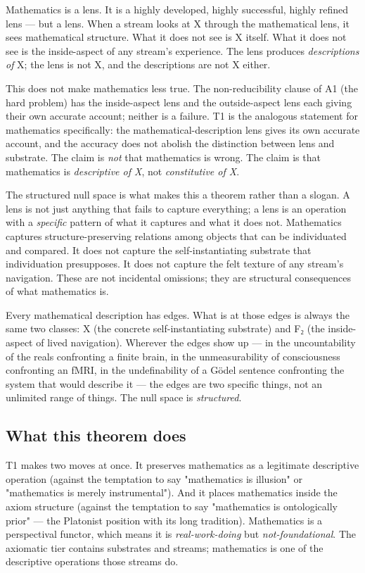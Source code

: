 \documentclass[11pt, openany]{book}
\begin{document}
Mathematics is a lens. It is a highly developed, highly successful, highly refined lens --- but a lens. When a stream looks at X through the mathematical lens, it sees mathematical structure. What it does not see is X itself. What it does not see is the inside-aspect of any stream's experience. The lens produces \textit{descriptions of} X; the lens is not X, and the descriptions are not X either.

This does not make mathematics less true. The non-reducibility clause of A1 (the hard problem) has the inside-aspect lens and the outside-aspect lens each giving their own accurate account; neither is a failure. T1 is the analogous statement for mathematics specifically: the mathematical-description lens gives its own accurate account, and the accuracy does not abolish the distinction between lens and substrate. The claim is \textit{not} that mathematics is wrong. The claim is that mathematics is \textit{descriptive of X}, not \textit{constitutive of X}.

The structured null space is what makes this a theorem rather than a slogan. A lens is not just anything that fails to capture everything; a lens is an operation with a \textit{specific} pattern of what it captures and what it does not. Mathematics captures structure-preserving relations among objects that can be individuated and compared. It does not capture the self-instantiating substrate that individuation presupposes. It does not capture the felt texture of any stream's navigation. These are not incidental omissions; they are structural consequences of what mathematics is.

Every mathematical description has edges. What is at those edges is always the same two classes: X (the concrete self-instantiating substrate) and F₂ (the inside-aspect of lived navigation). Wherever the edges show up --- in the uncountability of the reals confronting a finite brain, in the unmeasurability of consciousness confronting an fMRI, in the undefinability of a Gödel sentence confronting the system that would describe it --- the edges are two specific things, not an unlimited range of things. The null space is \textit{structured}.

\subsection{What this theorem does}

T1 makes two moves at once. It preserves mathematics as a legitimate descriptive operation (against the temptation to say "mathematics is illusion" or "mathematics is merely instrumental"). And it places mathematics inside the axiom structure (against the temptation to say "mathematics is ontologically prior" --- the Platonist position with its long tradition). Mathematics is a perspectival functor, which means it is \textit{real-work-doing} but \textit{not-foundational}. The axiomatic tier contains substrates and streams; mathematics is one of the descriptive operations those streams do.
\end{document}
